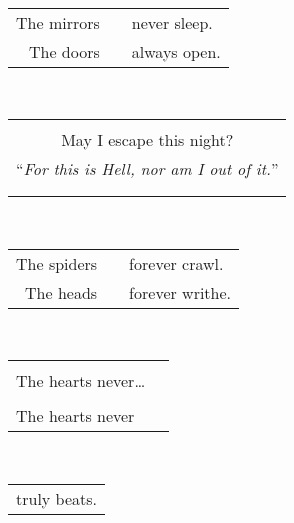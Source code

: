\documentclass{article}
\begin{document}
\begin{center}
\begin{tabular}{ll}
\end{tabular}\\
\begin{tabular}{rcl}
The mirrors\thinspace\thinspace & \hspace*{4ex} & never sleep. \\
The doors\thinspace\thinspace && always open.\hspace*{3.8ex} \\
\end{tabular}\\
\begin{tabular}{c}
\\
\\
May I escape this night? \\
``\textit{For this is Hell, nor am I out of it.}'' \\
\\
\\
\end{tabular}\\
\begin{tabular}{rcl}
The spiders & \hspace*{4ex}\thinspace\thinspace & forever crawl.\hspace*{3.6ex} \\
The heads && forever writhe. \\
\end{tabular} \\
\begin{tabular}{ll}
&\\
The hearts never\ldots{} &\\
&\\
The hearts never &\\
\end{tabular}\\
\begin{tabular}{l}
truly beats. \\
\end{tabular}
\end{center}
\end{document}

